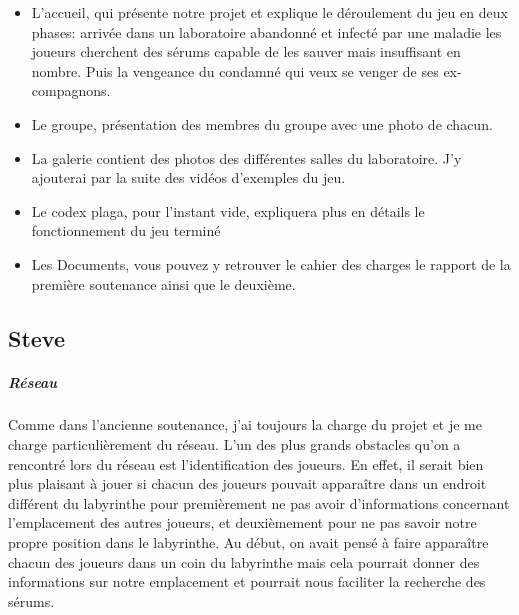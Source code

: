 \documentclass{article}
\begin{document}
\begin{itemize}
    \item L'accueil, qui présente notre projet et explique le déroulement du jeu en deux phases: arrivée dans un laboratoire abandonné et infecté par une maladie les joueurs cherchent des sérums capable de les sauver mais insuffisant en nombre. Puis la vengeance du condamné qui veux se venger de ses ex-compagnons.
    \item Le groupe, présentation des membres du groupe avec une photo de chacun.
    \item La galerie contient des photos des différentes salles du laboratoire. J'y ajouterai par la suite des vidéos d'exemples du jeu.
    \item Le codex plaga, pour l'instant vide, expliquera plus en détails le fonctionnement du jeu terminé
    \item Les Documents, vous pouvez y retrouver le cahier des charges le rapport de la première soutenance ainsi que le deuxième.
\end{itemize}{}

\newpage
\subsection{Steve}

\subparagraph{Réseau}


Comme dans l'ancienne soutenance, j’ai toujours la charge du projet et je me charge particulièrement du réseau. L'un des plus grands obstacles qu'on a rencontré lors du réseau est l'identification des joueurs. En effet, il serait bien plus plaisant à jouer si chacun des joueurs pouvait apparaître dans un endroit différent du labyrinthe pour premièrement ne pas avoir d'informations concernant l'emplacement des autres joueurs, et deuxièmement pour ne pas savoir notre propre position dans le labyrinthe. Au début, on avait pensé à faire apparaître chacun des joueurs dans un coin du labyrinthe mais cela pourrait donner des informations sur notre emplacement et pourrait nous faciliter la recherche des sérums.
\end{document}
